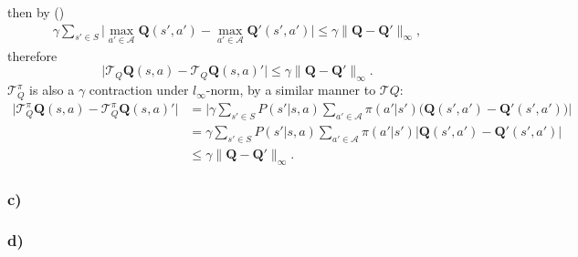 \documentclass[12pt]{article}
\begin{document}
then by ()
\begin{equation*}
    \begin{split}
        \gamma \sum_{s'\in S}\Big|\max_{a' \in \mathcal{A}}\mathbf{Q}(s',a')-\max_{a' \in \mathcal{A}}\mathbf{Q}'(s',a')\Big| \leq \gamma \|\mathbf{Q} - \mathbf{Q'}\|_\infty,
    \end{split}
\end{equation*}
therefore
\begin{equation*}
    \Big|\mathcal{T}_Q\mathbf{Q}(s,a)-\mathcal{T}_Q\mathbf{Q}(s,a)'\Big| \leq \gamma \|\mathbf{Q} - \mathbf{Q'}\|_\infty.
\end{equation*}
$\mathcal{T}^\pi_Q$ is also a $\gamma$ contraction under $l_\infty$-norm, by a similar manner to $\mathcal{T}Q$:
\begin{equation}
    \begin{split}
        \Big|\mathcal{T}^\pi_Q\mathbf{Q}(s,a)-\mathcal{T}^\pi_Q\mathbf{Q}(s,a)'\Big| &= \Big|\gamma \sum_{s'\in S}P(s'|s,a)\sum_{a'\in \mathcal{A}}\pi(a'|s')\Big(\mathbf{Q}(s',a')-\mathbf{Q}'(s',a')\Big)\Big| \\
        &= \gamma \sum_{s'\in S}P(s'|s,a)\sum_{a'\in \mathcal{A}}\pi(a'|s')\Big|\mathbf{Q}(s',a')-\mathbf{Q}'(s',a')\Big| \\
        &\leq \gamma \|\mathbf{Q} - \mathbf{Q'}\|_\infty.
    \end{split}
\end{equation}

\subsubsection*{c)}
\subsubsection*{d)}
\end{document}
